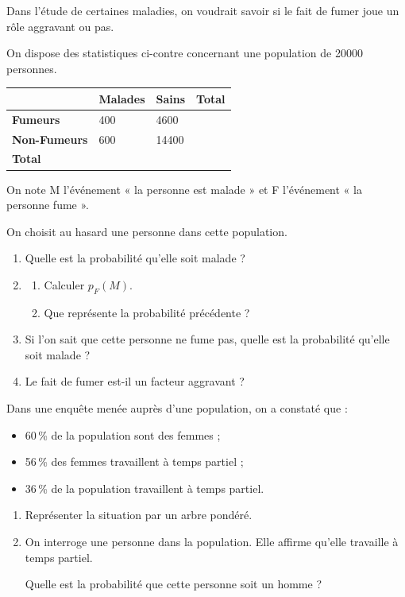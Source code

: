 \documentclass[a4paper,11pt]{article}
\begin{document}
\begin{cexercice}
Dans l’étude de certaines maladies, on voudrait savoir si le fait de fumer joue un rôle aggravant ou pas.

On dispose des statistiques ci-contre concernant une population de \num{20000} personnes.
%
\begin{center}
	\begin{tabularx}{0.8\linewidth}{|Y|Y|Y|Y|}
		\hline
		 & \textbf{Malades} & \textbf{Sains} & \textbf{Total} \\ \hline
		\textbf{Fumeurs} & 400 & \num{4600} &  \\ \hline
		\textbf{Non-Fumeurs} & 600 & \num{14400} & \\ \hline
		\textbf{Total} & & & \\ \hline
	\end{tabularx}
\end{center}
%
On note M l’événement « la personne est malade » et F l’événement « la personne fume ».

On choisit au hasard une personne dans cette population.
%
\begin{enumerate}
	\item Quelle est la probabilité qu’elle soit malade ?
	\item 
	\begin{enumerate}
		\item Calculer $p_F(M)$.
		\item Que représente la probabilité précédente ?
	\end{enumerate}
	\item Si l’on sait que cette personne ne fume pas, quelle est la probabilité qu’elle soit malade ?
	\item Le fait de fumer est-il un facteur aggravant ?
\end{enumerate}
\end{cexercice}

\begin{cexercice}
Dans une enquête menée auprès d’une population, on a constaté que :
\begin{itemize}
	\item 60\,\% de la population sont des femmes ;
	\item 56\,\% des femmes travaillent à temps partiel ;
	\item 36\,\% de la population travaillent à temps partiel.
\end{itemize}
%
\begin{enumerate}
	\item Représenter la situation par un arbre pondéré.
	\item On interroge une personne dans la population. Elle affirme qu’elle travaille à temps partiel.
	
	Quelle est la probabilité que cette personne soit un homme ?
\end{enumerate}
\end{cexercice}
\end{document}
